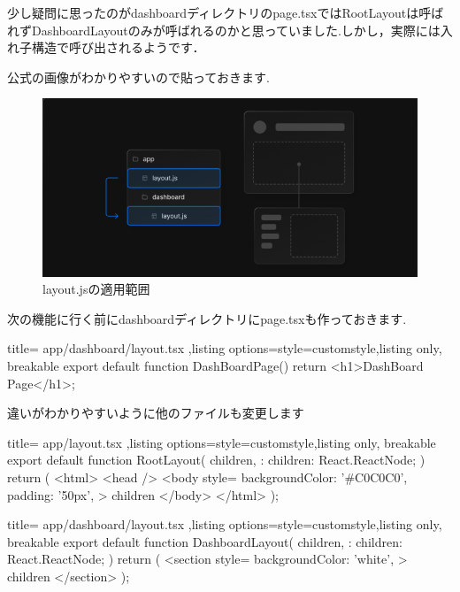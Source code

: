 少し疑問に思ったのがdashboardディレクトリのpage.tsxではRootLayoutは呼ばれずDashboardLayoutのみが呼ばれるのかと思っていました.しかし，実際には入れ子構造で呼び出されるようです．

公式の画像がわかりやすいので貼っておきます.
\begin{figure}[H]
  \centering
  \includegraphics[width=12cm]{./image/03-Tech/chap4/02.png}
  \caption{layout.jsの適用範囲}
\end{figure}

次の機能に行く前にdashboardディレクトリにpage.tsxも作っておきます.
\begin{tcblisting}{title={
        app/dashboard/layout.tsx
      },listing options={style=customstyle},listing only, breakable}
  export default function DashBoardPage() {
      return <h1>DashBoard Page</h1>;
    }

\end{tcblisting}


違いがわかりやすいように他のファイルも変更します
\begin{tcblisting}{title={
        app/layout.tsx
      },listing options={style=customstyle},listing only, breakable}
  export default function RootLayout({
      children,
    }: {
  children: React.ReactNode;
  }) {
  return (
  <html>
  <head />
  <body
  style={{
      backgroundColor: '#C0C0C0',
      padding: '50px',
    }}
  >
    {children}
  </body>
  </html>
  );
  }

\end{tcblisting}




\begin{tcblisting}{title={
        app/dashboard/layout.tsx
      },listing options={style=customstyle},listing only, breakable}
  export default function DashboardLayout({
      children,
    }: {
  children: React.ReactNode;
  }) {
  return (
  <section
  style={{
      backgroundColor: 'white',
    }}
  >
    {children}
  </section>
  );
  }
\end{tcblisting}



